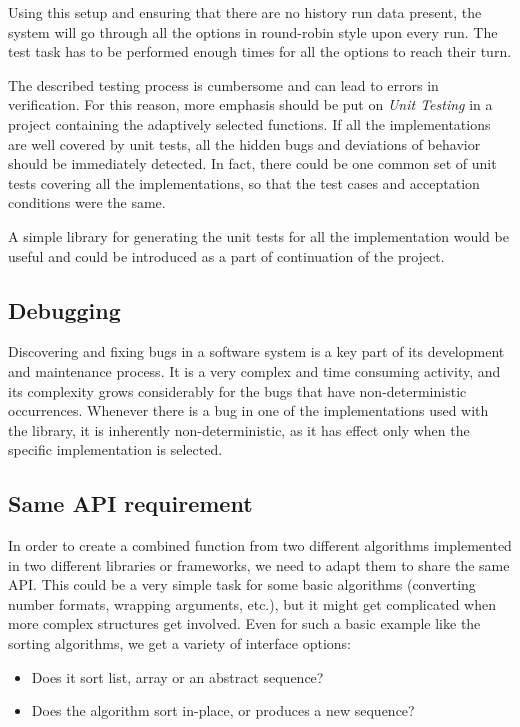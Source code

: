 Using this setup and ensuring that there are no history run data present, the system will go through all the options in round-robin style upon every run. The test task has to be performed enough times for all the options to reach their turn.

The described testing process is cumbersome and can lead to errors in verification. For this reason, more emphasis should be put on \textit{Unit Testing} in a project containing the adaptively selected functions. If all the implementations are well covered by unit tests, all the hidden bugs and deviations of behavior should be immediately detected. In fact, there could be one common set of unit tests covering all the implementations, so that the test cases and acceptation conditions were the same.

A simple library for generating the unit tests for all the implementation would be useful and could be introduced as a part of continuation of the project.

\subsection{Debugging}

Discovering and fixing bugs in a software system is a key part of its development and maintenance process. It is a very complex and time consuming activity, and its complexity grows considerably for the bugs that have non-deterministic occurrences. Whenever there is a bug in one of the implementations used with the library, it is inherently non-deterministic, as it has effect only when the specific implementation is selected.

\subsection{Same API requirement}

In order to create a combined function from two different algorithms implemented in two different libraries or frameworks, we need to adapt them to share the same API. This could be a very simple task for some basic algorithms (converting number formats, wrapping arguments, etc.), but it might get complicated when more complex structures get involved. Even for such a basic example like the sorting algorithms, we get a variety of interface options:

\begin{itemize}
	\item Does it sort list, array or an abstract sequence?
	\item Does the algorithm sort in-place, or produces a new sequence?
\end{itemize}

